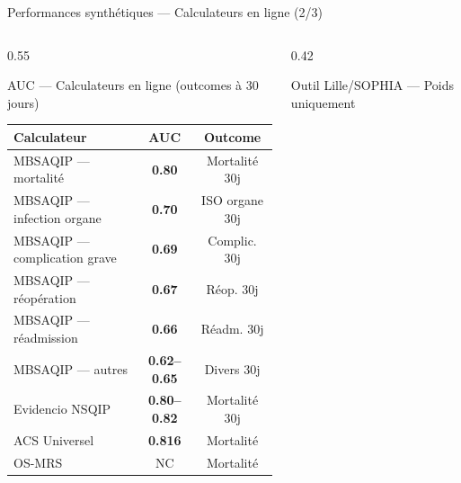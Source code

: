 \documentclass[aspectratio=169]{beamer}
\begin{document}
\begin{frame}{Performances synthétiques --- Calculateurs en ligne (2/3)}
  \begin{columns}[T]
    \begin{column}{0.55\textwidth}
      \begin{block}{AUC --- Calculateurs en ligne (outcomes à 30 jours)}
        \footnotesize
        \begin{tabular}{lcc}
          \toprule
          \textbf{Calculateur} & \textbf{AUC} & \textbf{Outcome} \\
          \midrule
          MBSAQIP --- mortalité
            & \textcolor{vertdoux}{\textbf{0.80}}
            & Mortalité 30j \\[3pt]
          MBSAQIP --- infection organe
            & \textcolor{vertdoux}{\textbf{0.70}}
            & ISO organe 30j \\[3pt]
          MBSAQIP --- complication grave
            & \textcolor{orangemod}{\textbf{0.69}}
            & Complic. 30j \\[3pt]
          MBSAQIP --- réopération
            & \textcolor{orangemod}{\textbf{0.67}}
            & Réop. 30j \\[3pt]
          MBSAQIP --- réadmission
            & \textcolor{orangemod}{\textbf{0.66}}
            & Réadm. 30j \\[3pt]
          MBSAQIP --- autres
            & \textcolor{orangemod}{\textbf{0.62--0.65}}
            & Divers 30j \\[3pt]
          Evidencio NSQIP
            & \textcolor{vertdoux}{\textbf{0.80--0.82}}
            & Mortalité 30j \\[3pt]
          ACS Universel
            & \textcolor{vertdoux}{\textbf{0.816}}
            & Mortalité \\[3pt]
          OS-MRS
            & NC
            & Mortalité \\
          \bottomrule
        \end{tabular}
      \end{block}
    \end{column}
    \begin{column}{0.42\textwidth}
      \begin{block}{Outil Lille/SOPHIA --- Poids uniquement}
        \footnotesize
        \begin{tabular}{lc}
          \toprule

\end{tabular}
\end{block}
\end{column}
\end{columns}
\end{frame}
\end{document}
